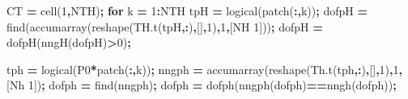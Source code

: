\documentclass[
]{article}
\newenvironment{Shaded}{\begin{snugshade}}{\end{snugshade}}
\newcommand{\FloatTok}[1]{\textcolor[rgb]{0.00,0.00,0.81}{#1}}
\newcommand{\KeywordTok}[1]{\textcolor[rgb]{0.13,0.29,0.53}{\textbf{#1}}}
\newcommand{\NormalTok}[1]{#1}
\newcommand{\OperatorTok}[1]{\textcolor[rgb]{0.81,0.36,0.00}{\textbf{#1}}}
\newcommand{\VariableTok}[1]{\textcolor[rgb]{0.00,0.00,0.00}{#1}}
\begin{document}
\begin{Shaded}
\begin{Highlighting}[]
\VariableTok{CT} \OperatorTok{=} \VariableTok{cell}\NormalTok{(}\FloatTok{1}\OperatorTok{,}\VariableTok{NTH}\NormalTok{)}\OperatorTok{;}
\KeywordTok{for} \VariableTok{k} \OperatorTok{=} \FloatTok{1}\OperatorTok{:}\VariableTok{NTH}
    \VariableTok{tpH} \OperatorTok{=} \VariableTok{logical}\NormalTok{(}\VariableTok{patch}\NormalTok{(}\OperatorTok{:,}\VariableTok{k}\NormalTok{))}\OperatorTok{;}
    \VariableTok{dofpH} \OperatorTok{=} \VariableTok{find}\NormalTok{(}\VariableTok{accumarray}\NormalTok{(}\VariableTok{reshape}\NormalTok{(}\VariableTok{TH}\NormalTok{.}\VariableTok{t}\NormalTok{(}\VariableTok{tpH}\OperatorTok{,:}\NormalTok{)}\OperatorTok{,}\NormalTok{[]}\OperatorTok{,}\FloatTok{1}\NormalTok{)}\OperatorTok{,}\FloatTok{1}\OperatorTok{,}\NormalTok{[}\VariableTok{NH} \FloatTok{1}\NormalTok{]))}\OperatorTok{;}
    \VariableTok{dofpH} \OperatorTok{=} \VariableTok{dofpH}\NormalTok{(}\VariableTok{nngH}\NormalTok{(}\VariableTok{dofpH}\NormalTok{)}\OperatorTok{\textgreater{}}\FloatTok{0}\NormalTok{)}\OperatorTok{;}

    \VariableTok{tph} \OperatorTok{=} \VariableTok{logical}\NormalTok{(}\VariableTok{P0}\OperatorTok{*}\VariableTok{patch}\NormalTok{(}\OperatorTok{:,}\VariableTok{k}\NormalTok{))}\OperatorTok{;}
    \VariableTok{nngph} \OperatorTok{=} \VariableTok{accumarray}\NormalTok{(}\VariableTok{reshape}\NormalTok{(}\VariableTok{Th}\NormalTok{.}\VariableTok{t}\NormalTok{(}\VariableTok{tph}\OperatorTok{,:}\NormalTok{)}\OperatorTok{,}\NormalTok{[]}\OperatorTok{,}\FloatTok{1}\NormalTok{)}\OperatorTok{,}\FloatTok{1}\OperatorTok{,}\NormalTok{[}\VariableTok{Nh} \FloatTok{1}\NormalTok{])}\OperatorTok{;}
    \VariableTok{dofph} \OperatorTok{=} \VariableTok{find}\NormalTok{(}\VariableTok{nngph}\NormalTok{)}\OperatorTok{;}
    \VariableTok{dofph} \OperatorTok{=} \VariableTok{dofph}\NormalTok{(}\VariableTok{nngph}\NormalTok{(}\VariableTok{dofph}\NormalTok{)}\OperatorTok{==}\VariableTok{nngh}\NormalTok{(}\VariableTok{dofph}\NormalTok{))}\OperatorTok{;}


\end{Highlighting}
\end{Shaded}
\end{document}
